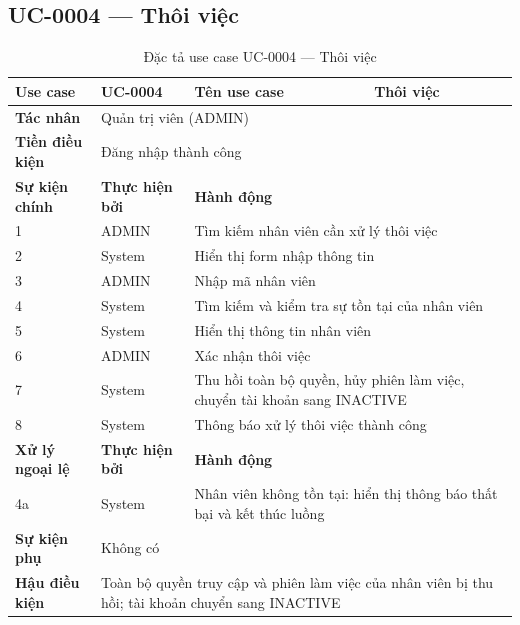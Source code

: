 \documentclass[../DoAn.tex]{subfiles}
\begin{document}
\subsection{UC-0004 — Thôi việc}

\begin{table}[H]
\centering
\caption{Đặc tả use case UC-0004 — Thôi việc}
\label{tab:uc-0004}
\renewcommand{\arraystretch}{1.3}
\begin{tabular}{|p{3.0cm}|p{2.3cm}|p{2.7cm}|p{4.5cm}|}
\hline
\textbf{Use case} & UC-0004 & \textbf{Tên use case} & Thôi việc \\
\hline
\textbf{Tác nhân} & \multicolumn{3}{p{9.5cm}|}{Quản trị viên (ADMIN)} \\
\hline
\textbf{Tiền điều kiện} & \multicolumn{3}{p{9.5cm}|}{Đăng nhập thành công} \\
\hline
\textbf{Sự kiện chính} & \textbf{Thực hiện bởi} & \multicolumn{2}{p{7.2cm}|}{\textbf{Hành động}} \\
\hline
1 & ADMIN & \multicolumn{2}{p{7.2cm}|}{Tìm kiếm nhân viên cần xử lý thôi việc} \\
\hline
2 & System & \multicolumn{2}{p{7.2cm}|}{Hiển thị form nhập thông tin} \\
\hline
3 & ADMIN & \multicolumn{2}{p{7.2cm}|}{Nhập mã nhân viên} \\
\hline
4 & System & \multicolumn{2}{p{7.2cm}|}{Tìm kiếm và kiểm tra sự tồn tại của nhân viên} \\
\hline
5 & System & \multicolumn{2}{p{7.2cm}|}{Hiển thị thông tin nhân viên} \\
\hline
6 & ADMIN & \multicolumn{2}{p{7.2cm}|}{Xác nhận thôi việc} \\
\hline
7 & System & \multicolumn{2}{p{7.2cm}|}{Thu hồi toàn bộ quyền, hủy phiên làm việc, chuyển tài khoản sang INACTIVE} \\
\hline
8 & System & \multicolumn{2}{p{7.2cm}|}{Thông báo xử lý thôi việc thành công} \\
\hline
\textbf{Xử lý ngoại lệ} & \textbf{Thực hiện bởi} & \multicolumn{2}{p{7.2cm}|}{\textbf{Hành động}} \\
\hline
4a & System & \multicolumn{2}{p{7.2cm}|}{Nhân viên không tồn tại: hiển thị thông báo thất bại và kết thúc luồng} \\
\hline
\textbf{Sự kiện phụ} & \multicolumn{3}{p{9.5cm}|}{Không có} \\
\hline
\textbf{Hậu điều kiện} & \multicolumn{3}{p{9.5cm}|}{Toàn bộ quyền truy cập và phiên làm việc của nhân viên bị thu hồi; tài khoản chuyển sang INACTIVE} \\
\hline
\end{tabular}
\end{table}
\end{document}
